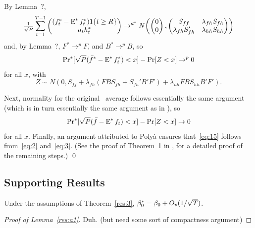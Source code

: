 \documentclass[12pt,fleqn]{article}
\begin{document}
  By Lemma~?,
  \begin{equation}\label{eq:19}
    \tfrac{1}{\sqrt{P}} \sum_{t=1}^{T-1} \begin{pmatrix}
      (f_t^* - \operatorname{E}^* f_t^*) 1\{t \geq R\} \\ a_t h_t^*
    \end{pmatrix} \to^{d^*}
    N\!
    \begin{pmatrix}
      \begin{pmatrix} 0 \\ 0 \end{pmatrix},
      \begin{pmatrix}
        S_{ff} & \lambda_{fh} S_{fh} \\
        \lambda_{fh} S_{fh}' &  \lambda_{hh} S_{hh}
      \end{pmatrix}
    \end{pmatrix}
  \end{equation}
  and, by Lemma~?, $F^* \to^p F$, and $B^* \to^p B$, so
  \begin{equation}\label{eq:2}
    \operatorname{Pr}^*[\sqrt{P} (\bar f^* - \operatorname{E}^* f_t^*) < x] - \operatorname{Pr}[Z < x] \to^p 0
  \end{equation}
  for all $x$, with
  \begin{equation*}
    Z \sim N(0, S_{ff} + \lambda_{fh} (F B S_{fh} + S_{fh}' B'F') + \lambda_{hh} F B S_{hh} B' F').
  \end{equation*}

  Next, normality for the original \oos\ average follows essentially
  the same argument (which is in turn essentially the same argument as
  in \citealp{Wes:96}), so
  \begin{equation}\label{eq:3}
    \operatorname{Pr}^*[\sqrt{P} (\bar f - \operatorname{E}^* f_t) < x] - \operatorname{Pr}[Z < x] \to 0
  \end{equation}
  for all $x$. Finally, an argument attributed to Poly{\`a} ensures
  that~\eqref{eq:15} follows from~\eqref{eq:2} and~\eqref{eq:3}. (See
  the proof of Theorem~1 in \citealp{Cal:14}, for a detailed proof of
  the remaining steps.)  \qed

\subsection{Supporting Results}

\begin{lema}\label{res:a1}
  Under the assumptions of Theorem~\ref{res:3}, $\beta_0^* = \beta_0 +
  O_p(1/\sqrt{T})$.
\end{lema}

\begin{proof}[Proof of Lemma~\ref{res:a1}]
  Duh. (but need some sort of compactness argument)
\end{proof}
\end{document}
